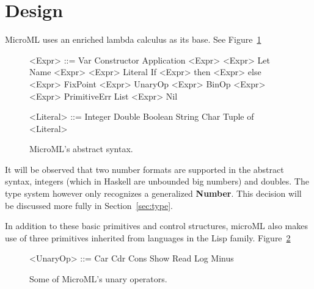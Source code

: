 \documentclass[12pt, a4paper]{report}
\begin{document}
\section{Design}
MicroML uses an enriched lambda calculus as its base. See Figure~\ref{fig:syntax}

\begin{figure}
    \begin{minipage}[t]{0.5\textwidth}
        \begin{grammar}
            <Expr> ::= Var
            \alt{} Constructor 
            \alt{} Application <Expr> <Expr>
            \alt{} Let Name <Expr> <Expr>
            \alt{} Literal 
            \alt{} If <Expr> then <Expr> else <Expr>
            \alt{} FixPoint <Expr>
            \alt{} UnaryOp <Expr>
            \alt{} BinOp <Expr> <Expr>
            \alt{} PrimitiveErr 
            \alt{} List <Expr>
            \alt{} Nil
        \end{grammar}
    \end{minipage}
    \begin{minipage}[t]{0.5\textwidth}
        \begin{grammar}
            <Literal> ::= Integer
            \alt{} Double
            \alt{} Boolean
            \alt{} String
            \alt{} Char
            \alt{} Tuple of <Literal>
        \end{grammar}
    \end{minipage}
    \caption{MicroML's abstract syntax.}
\label{fig:syntax}
\end{figure}

It will be observed that two number formats are supported in the abstract syntax, integers (which in
Haskell are unbounded big numbers) and doubles. The type system however only recognizes a
generalized \textbf{Number}. This decision will be discussed more fully in Section~\ref{sec:type}.

In addition to these basic primitives and control structures, microML also makes use of three
primitives inherited from languages in the Lisp family. Figure~\ref{fig:unary}

\begin{figure}
        \begin{grammar}
            <UnaryOp> ::= Car 
            \alt{} Cdr
            \alt{} Cons
            \alt{} Show
            \alt{} Read
            \alt{} Log
            \alt{} Minus
        \end{grammar}
    \caption{Some of MicroML's unary operators.}
\label{fig:unary}
\end{figure}
\end{document}
